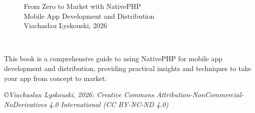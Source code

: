 
\thispagestyle{empty}

\begin{figure}
  \begin{minipage}{0.9\textwidth}
    \large From Zero to Market with NativePHP\\
    \vspace{9mm}
    \noindent \small Mobile App Development and Distribution\\
    \vspace{10mm}
    Viachaslau Lyskouski, 2026\\
    \vspace{2mm}
  \end{minipage}
  \hfill
\end{figure}
~
\vspace{2cm}

\noindent This book is a comprehensive guide to using NativePHP for mobile app development and
distribution, providing practical insights and techniques to take your app from concept to
market.

\vspace{1cm}

\noindent \emph{\small \copyright Viachaslau Lyskouski, 2026: Creative Commons Attribution-NonCommercial-NoDerivatives
4.0 International (CC BY-NC-ND 4.0)}

\newpage
\thispagestyle{empty}
~
